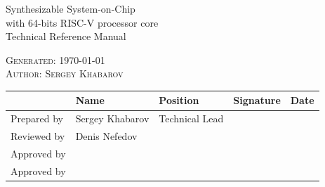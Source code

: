 \documentclass[oneside]{book}
\newcommand{\+}{\discretionary{\mbox{\scriptsize$\hookleftarrow$}}{}{}}
\newcommand{\clearemptydoublepage}{%
  \newpage{\pagestyle{empty}\cleardoublepage}%
}
\begin{document}
\hypersetup{pageanchor=false,
             bookmarks=true,
             bookmarksnumbered=true,
             pdfencoding=unicode
            }
\begin{titlepage}
\vspace*{7cm}
\begin{center}%
{\Large Synthesizable System-on-Chip}\\
\vspace*{1\baselineskip}
{\Large with 64-bits RISC-V processor core}\\
\vspace*{2\baselineskip}
{\Large Technical Reference Manual}\\
\end{center}
\begin{flushright}%
\vspace*{3cm}
{\scshape Generated:    \today}\\
{\scshape Author: Sergey Khabarov}
\end{flushright}

\begin{center}%
\vspace*{3cm}
\begin{tabular}{ | m{2cm} | m{3cm} | m{3cm} | m{2cm} | m{2cm} | }
\hline
  & Name & Position & Signature &  Date \\
\hline
Prepared by & Sergey Khabarov & Technical Lead &  & \\
\hline
Reviewed by & Denis Nefedov &  &  & \\
\hline
Approved by &  &  &  & \\
\hline
Approved by &  &  &  & \\
\hline
\end{tabular}
\end{center}
\end{titlepage}
\clearemptydoublepage
\tableofcontents
\clearemptydoublepage
{}
\hypersetup{pageanchor=true}

\end{document}

